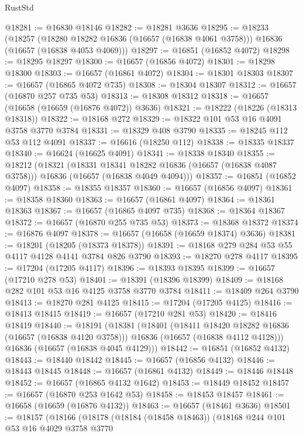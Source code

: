 \begin{lexlean}{RustStd}
\begin{coremodule}
@18281 := @16830 @18146
@18282 := @18281 @3636
@18295 := @18233
    (@18257
      (@18280 @18282 @16836 (@16657 (@16838 @4061 @3758)))
      @16836
      (@16657 (@16838 @4053 @4069)))
@18297 := @16851 (@16852 @4072)
@18298 := @18295 @18297
@18300 := @16657 (@16856 @4072)
@18301 := @18298 @18300
@18303 := @16657 (@16861 @4072)
@18304 := @18301 @18303
@18307 := @16657 (@16865 @4072 @735)
@18308 := @18304 @18307
@18312 := @16657 (@16870 @257 @735 @53)
@18313 := @18308 @18312
@18318 := @16657 (@16658 (@16659 (@16876 @4072)) @3636)
@18321 := @18222 (@18226 (@18313 @18318))
@18322 := @18168 @272
@18329 := @18322 @101 @53 @16 @4091 @3758 @3770 @3784
@18331 := @18329 @408 @3790
@18335 := @18245 @112 @53 @112 @4091
@18337 := @16616 (@18250 @112)
@18338 := @18335 @18337
@18340 := @16624 (@16625 @4091)
@18341 := @18338 @18340
@18355 := @18212
    (@18321
      (@18331 @18341 @18282 @16836 (@16657 (@16838 @4087 @3758)))
      @16836
      (@16657 (@16838 @4049 @4094)))
@18357 := @16851 (@16852 @4097)
@18358 := @18355 @18357
@18360 := @16657 (@16856 @4097)
@18361 := @18358 @18360
@18363 := @16657 (@16861 @4097)
@18364 := @18361 @18363
@18367 := @16657 (@16865 @4097 @735)
@18368 := @18364 @18367
@18372 := @16657 (@16870 @255 @735 @53)
@18373 := @18368 @18372
@18374 := @16876 @4097
@18378 := @16657 (@16658 (@16659 @18374) @3636)
@18381 := @18201 (@18205 (@18373 @18378))
@18391 := @18168 @279 @284 @53 @55 @4117 @4128 @4141 @3784 @826 @3790
@18393 := @18270 @278 @4117
@18395 := @17204 (@17205 @4117)
@18396 := @18393 @18395
@18399 := @16657 (@17210 @278 @53)
@18401 := @18391 (@18396 @18399)
@18409 := @18168 @282 @101 @53 @16 @4125 @3758 @3770 @3784
@18411 := @18409 @264 @3790
@18413 := @18270 @281 @4125
@18415 := @17204 (@17205 @4125)
@18416 := @18413 @18415
@18419 := @16657 (@17210 @281 @53)
@18420 := @18416 @18419
@18440 := @18191
    (@18381
      (@18401
        (@18411 @18420 @18282 @16836 (@16657 (@16838 @4120 @3758)))
        @16836
        (@16657 (@16838 @4112 @4128)))
      @16836
      (@16657 (@16838 @4045 @4129)))
@18442 := @16851 (@16852 @4132)
@18443 := @18440 @18442
@18445 := @16657 (@16856 @4132)
@18446 := @18443 @18445
@18448 := @16657 (@16861 @4132)
@18449 := @18446 @18448
@18452 := @16657 (@16865 @4132 @1642)
@18453 := @18449 @18452
@18457 := @16657 (@16870 @253 @1642 @53)
@18458 := @18453 @18457
@18461 := @16658 (@16659 (@16876 @4132))
@18463 := @16657 (@18461 @3636)
@18501 := @18157
    (@18166
      (@18178
        (@18184 (@18458 @18463))
        (@18168
          @244
          @101
          @53
          @16
          @4029
          @3758
          @3770

\end{coremodule}
\end{lexlean}
